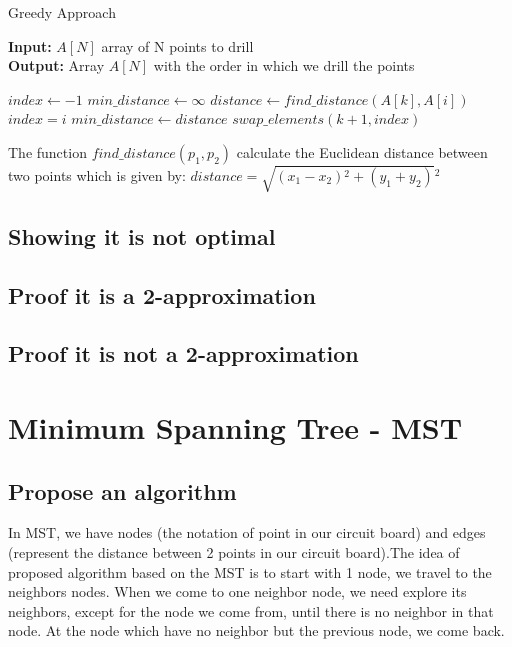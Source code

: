 \documentclass{article}
\begin{document}
\begin{algorithm}[H]
\caption{Greedy Approach}
\textbf{Input: }$A[N]$ array of N points to drill\\
\textbf{Output: } Array $A[N]$ with the order in which we drill the points
\begin{algorithmic} 
    \State $index \leftarrow -1$
    \State $min\_distance \leftarrow \infty $
        \State $distance \leftarrow find\_distance(A[k], A[i])$
            \State $index = i$ 
            \State $min\_distance \leftarrow distance$
        \EndIf
    \EndFor
    \State $swap\_elements(k+1, index)$
\EndFor
\end{algorithmic}
\end{algorithm}
The function $find\_distance(p_{1}, p_{2})$ calculate the Euclidean distance between two points which is given by:
$distance = \sqrt{(x_{1}-x_{2}){^2} + (y_{1}+y_{2})}{^2} $

\subsection{Showing it is not optimal}
\subsection{Proof it is a 2-approximation}
\subsection{Proof it is not a 2-approximation}

\section{Minimum Spanning Tree - MST}

\subsection{Propose an algorithm}
In MST, we have nodes (the notation of point in our circuit board) and edges (represent the distance between 2 points in our circuit board).The idea of proposed algorithm based on the MST is to start with 1 node, we travel to the neighbors nodes. When we come to one neighbor node, we need explore its neighbors, except for the node we come from, until there is no neighbor in that node. At the node which have no neighbor but the previous node, we come back.
\end{document}
